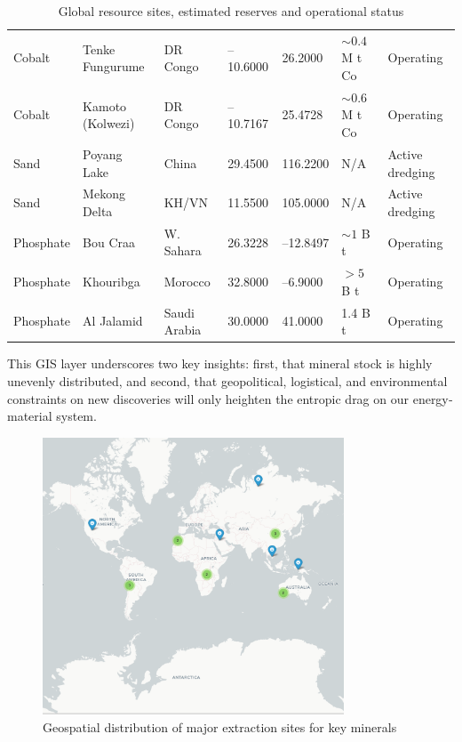 \documentclass[a4paper,12pt]{article}
\begin{document}
\begin{table}[H]
{\begin{tabular}{lllllll}
      Cobalt               & Tenke Fungurume  & DR Congo     & –10.6000 & 26.2000   & \(\sim\!0.4\) M t Co& Operating \\
      Cobalt               & Kamoto (Kolwezi)& DR Congo     & –10.7167 & 25.4728   & \(\sim\!0.6\) M t Co& Operating \\
      Sand                 & Poyang Lake      & China        & 29.4500  & 116.2200  & N/A                & Active dredging \\
      Sand                 & Mekong Delta     & KH/VN        & 11.5500  & 105.0000  & N/A                & Active dredging \\
      Phosphate            & Bou Craa         & W. Sahara    & 26.3228  & –12.8497  & \(\sim\!1\) B t    & Operating \\
      Phosphate            & Khouribga        & Morocco      & 32.8000  & –6.9000   & \(>\!5\) B t       & Operating \\
      Phosphate            & Al Jalamid       & Saudi Arabia & 30.0000  & 41.0000   & 1.4 B t            & Operating \\
      \bottomrule
    \end{tabular}%
  }
  \caption{Global resource sites, estimated reserves and operational status}
  \label{tab:global-resources}
\end{table}

This GIS layer underscores two key insights: first, that mineral stock is highly unevenly distributed, and second, that geopolitical, logistical, and environmental constraints on new discoveries will only heighten the entropic drag on our energy‐material system.

\begin{figure}[H]
  \centering
  \includegraphics[width=0.8\textwidth]{figures/gis_finished.png}
  \caption{Geospatial distribution of major extraction sites for key minerals}
  \label{fig:big-mines}
\end{figure}
\end{document}
